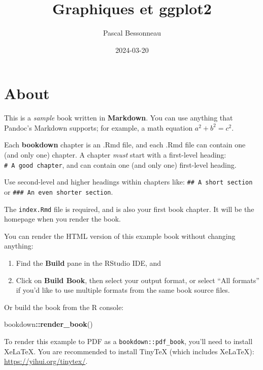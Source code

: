 \documentclass[
]{book}
\title{Graphiques et ggplot2}
\author{Pascal Bessonneau}
\date{2024-03-20}
\newenvironment{Shaded}{\begin{snugshade}}{\end{snugshade}}
\newcommand{\FunctionTok}[1]{\textcolor[rgb]{0.13,0.29,0.53}{\textbf{#1}}}
\newcommand{\NormalTok}[1]{#1}
\newcommand{\SpecialCharTok}[1]{\textcolor[rgb]{0.81,0.36,0.00}{\textbf{#1}}}
\begin{document}
\maketitle

{
\setcounter{tocdepth}{1}
\tableofcontents
}
\hypertarget{about}{%
\chapter{About}\label{about}}

This is a \emph{sample} book written in \textbf{Markdown}. You can use anything that Pandoc's Markdown supports; for example, a math equation \(a^2 + b^2 = c^2\).

Each \textbf{bookdown} chapter is an .Rmd file, and each .Rmd file can contain one (and only one) chapter. A chapter \emph{must} start with a first-level heading: \texttt{\#\ A\ good\ chapter}, and can contain one (and only one) first-level heading.

Use second-level and higher headings within chapters like: \texttt{\#\#\ A\ short\ section} or \texttt{\#\#\#\ An\ even\ shorter\ section}.

The \texttt{index.Rmd} file is required, and is also your first book chapter. It will be the homepage when you render the book.

You can render the HTML version of this example book without changing anything:

\begin{enumerate}
\def\labelenumi{\arabic{enumi}.}
\item
  Find the \textbf{Build} pane in the RStudio IDE, and
\item
  Click on \textbf{Build Book}, then select your output format, or select ``All formats'' if you'd like to use multiple formats from the same book source files.
\end{enumerate}

Or build the book from the R console:

\begin{Shaded}
\begin{Highlighting}[]
\NormalTok{bookdown}\SpecialCharTok{::}\FunctionTok{render\_book}\NormalTok{()}
\end{Highlighting}
\end{Shaded}

To render this example to PDF as a \texttt{bookdown::pdf\_book}, you'll need to install XeLaTeX. You are recommended to install TinyTeX (which includes XeLaTeX): \url{https://yihui.org/tinytex/}.
\end{document}
